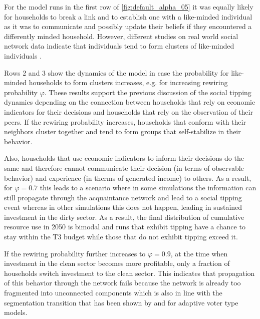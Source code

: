For the model runs in the first row of \cref{fig:default_alpha_05} it was equally likely for households to break a link and to establish one with a like-minded individual as it was to communicate and possibly update their beliefs if they encountered a differently minded household. 
However, different studies on real world social network data indicate that individuals tend to form clusters of like-minded individuals \citep{girvan2002community, Lerman2010, Law2011, Takhteyev2012}.

Rows 2 and 3 show the dynamics of the model in case the probability for like-minded households to form clusters increases, e.g. for increasing rewiring probability $\varphi$. These results support the previous discussion of the social tipping dynamics depending on the connection between households that rely on economic indicators for their decisions and households that rely on the observation of their peers. If the rewiring probability increases, households that conform with their neighbors cluster together and tend to form groups that self-stabilize in their behavior.

Also, households that use economic indicators to inform their decisions do the same and therefore cannot communicate their decision (in terms of observable behavior) and experience (in therms of generated income) to others. As a result, for $\varphi=0.7$ this leads to a scenario where in some simulations the information can still propagate through the acquaintance network and lead to a social tipping event whereas in other simulations this does not happen, leading in sustained investment in the dirty sector. As a result, the final distribution of cumulative resource use in 2050 is bimodal and runs that exhibit tipping have a chance to stay within the T3 budget while those that do not exhibit tipping exceed it.

If the rewiring probability further increases to $\varphi=0.9$, at the time when investment in the clean sector becomes more profitable, only a fraction of households switch investment to the clean sector. This indicates that propagation of this behavior through the network fails because the network is already too fragmented into unconnected components which is also in line with the segmentation transition that has been shown by \cite{Rogers2013, Wiedermann2015, Klamser2016} and \cite{Min2017} for adaptive voter type models.\\

